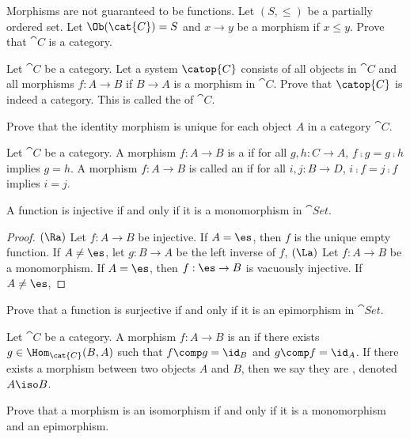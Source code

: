 \documentclass[10pt]{article}
\begin{document}
\begin{problem}
    Morphisms are not guaranteed to be functions. Let $(S,\le)$ be a partially ordered set. Let $\Ob(\cat{C})=S$ and $x\to y$ be a morphism if $x\le y$. Prove that $\cat{C}$ is a category.
\end{problem}
\begin{problem}
    Let $\cat{C}$ be a category. Let a system $\catop{C}$ consists of all objects in $\cat{C}$ and all morphisms $f:A\to B$ if $B\to A$ is a morphism in $\cat{C}$. Prove that $\catop{C}$ is indeed a category. This is called the  of $\cat{C}$.
\end{problem}
\begin{problem}
    Prove that the identity morphism is unique for each object $A$ in a category $\cat{C}$.
\end{problem}
\begin{definition}
    Let $\cat{C}$ be a category. A morphism $f:A\to B$ is a  if for all $g,h:C\to A$, $f\comp g=g\comp h$ implies $g=h$. A morphism $f:A\to B$ is called an  if for all $i,j:B\to D$, $i\comp f=j\comp f$ implies $i=j$.
\end{definition}
\begin{proposition}
    A function is injective if and only if it is a monomorphism in $\cat{Set}$.
\end{proposition}
\begin{proof}
    $(\Ra)$ Let $f:A\to B$ be injective. If $A=\es$, then $f$ is the unique empty function. If $A\ne\es$, let $g:B\to A$ be the left inverse of $f$, 
    $(\La)$ Let $f:A\to B$ be a monomorphism. If $A=\es$, then $f:\es\to B$ is vacuously injective. If $A\ne\es$, 
\end{proof}
\begin{problem}
    Prove that a function is surjective if and only if it is an epimorphism in $\cat{Set}$.
\end{problem}
\begin{definition}
    Let $\cat{C}$ be a category. A morphism $f:A\to B$ is an  if there exists $g\in{\Hom}_{\cat{C}}(B,A)$ such that $f\comp g={\id}_{B}$ and $g\comp f={\id}_{A}$. If there exists a morphism between two objects $A$ and $B$, then we say they are , denoted $A\iso B$.
\end{definition}
\begin{problem}
    Prove that a morphism is an isomorphism if and only if it is a monomorphism and an epimorphism.
\end{problem}
\end{document}
